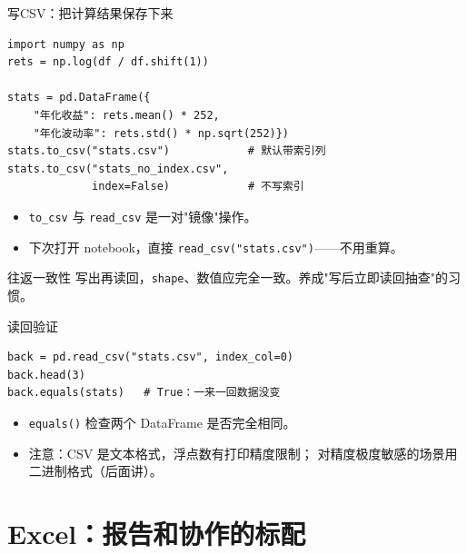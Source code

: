\documentclass[9pt]{ctexbeamer}
\begin{document}
\begin{frame}[fragile]{写CSV：把计算结果保存下来}
	\begin{lstlisting}
import numpy as np
rets = np.log(df / df.shift(1))

stats = pd.DataFrame({
    "年化收益": rets.mean() * 252,
    "年化波动率": rets.std() * np.sqrt(252)})
stats.to_csv("stats.csv")            # 默认带索引列
stats.to_csv("stats_no_index.csv",
             index=False)            # 不写索引
\end{lstlisting}
	\begin{itemize}
		\item \texttt{to\_csv} 与 \texttt{read\_csv} 是一对"镜像"操作。
		\item 下次打开 notebook，直接 \texttt{read\_csv("stats.csv")}——不用重算。
	\end{itemize}
	\begin{alertblock}{往返一致性}
		写出再读回，\texttt{shape}、数值应完全一致。养成"写后立即读回抽查"的习惯。
	\end{alertblock}
\end{frame}

\begin{frame}[fragile]{读回验证}
	\begin{lstlisting}
back = pd.read_csv("stats.csv", index_col=0)
back.head(3)
back.equals(stats)   # True：一来一回数据没变
\end{lstlisting}
	\begin{itemize}
		\item \texttt{equals()} 检查两个 DataFrame 是否完全相同。
		\item 注意：CSV 是文本格式，浮点数有打印精度限制；
			对精度极度敏感的场景用二进制格式（后面讲）。
	\end{itemize}
\end{frame}


\section{Excel：报告和协作的标配}
\end{document}
